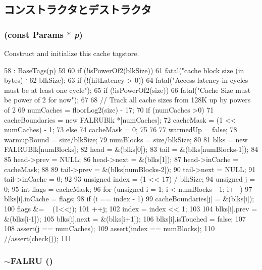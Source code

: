 \subsection{コンストラクタとデストラクタ}
\hypertarget{classFALRU_a008e99fdba3bde11cbd17bbc553a58f5}{
\subsubsection[{FALRU}]{ (const {\bf Params} $\ast$ {\em p})}}
\label{classFALRU_a008e99fdba3bde11cbd17bbc553a58f5}
Construct and initialize this cache tagstore. 


\begin{DoxyCode}
58     : BaseTags(p)
59 {
60     if (!isPowerOf2(blkSize))
61         fatal("cache block size (in bytes) `%
62               blkSize);
63     if (!(hitLatency > 0))
64         fatal("Access latency in cycles must be at least one cycle");
65     if (!isPowerOf2(size))
66         fatal("Cache Size must be power of 2 for now");
67 
68     // Track all cache sizes from 128K up by powers of 2
69     numCaches = floorLog2(size) - 17;
70     if (numCaches >0){
71         cacheBoundaries = new FALRUBlk *[numCaches];
72         cacheMask = (1 << numCaches) - 1;
73     } else {
74         cacheMask = 0;
75     }
76 
77     warmedUp = false;
78     warmupBound = size/blkSize;
79     numBlocks = size/blkSize;
80 
81     blks = new FALRUBlk[numBlocks];
82     head = &(blks[0]);
83     tail = &(blks[numBlocks-1]);
84 
85     head->prev = NULL;
86     head->next = &(blks[1]);
87     head->inCache = cacheMask;
88 
89     tail->prev = &(blks[numBlocks-2]);
90     tail->next = NULL;
91     tail->inCache = 0;
92 
93     unsigned index = (1 << 17) / blkSize;
94     unsigned j = 0;
95     int flags = cacheMask;
96     for (unsigned i = 1; i < numBlocks - 1; i++) {
97         blks[i].inCache = flags;
98         if (i == index - 1){
99             cacheBoundaries[j] = &(blks[i]);
100             flags &= ~ (1<<j);
101             ++j;
102             index = index << 1;
103         }
104         blks[i].prev = &(blks[i-1]);
105         blks[i].next = &(blks[i+1]);
106         blks[i].isTouched = false;
107     }
108     assert(j == numCaches);
109     assert(index == numBlocks);
110     //assert(check());
111 }
\end{DoxyCode}
\hypertarget{classFALRU_a642d32a0be0130f14545c0d7c2cf71a1}{
\subsubsection[{$\sim$FALRU}]{\setlength{\rightskip}{0pt plus 5cm}$\sim${\bf FALRU} ()}}
\label{classFALRU_a642d32a0be0130f14545c0d7c2cf71a1}




